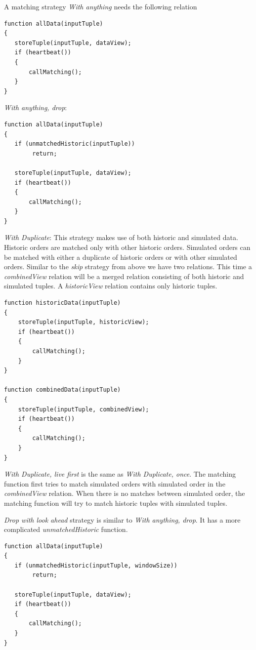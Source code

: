 \documentclass{article}
\begin{document}
\noindent A matching strategy \emph{With anything} needs the following relation
\begin{verbatim}     
function allData(inputTuple)
{
   storeTuple(inputTuple, dataView);
   if (heartbeat())
   {
       callMatching();
   }
}
\end{verbatim}

\noindent \emph{With anything, drop}:
\begin{verbatim}     
function allData(inputTuple)
{
   if (unmatchedHistoric(inputTuple))
        return;
    
   storeTuple(inputTuple, dataView);
   if (heartbeat())
   {
       callMatching();
   }
}
\end{verbatim}

\noindent \emph{With Duplicate}: This strategy makes use of both historic and simulated data. Historic orders are matched only with other historic orders. Simulated orders can be matched with either a duplicate of historic orders or with other simulated orders. Similar to the \emph{skip} strategy from above we have two relations. This time a \emph{combinedView} relation will be a merged relation consisting of both historic and simulated tuples. A \emph{historicView} relation contains only historic tuples.

\begin{verbatim}   
function historicData(inputTuple)
{
    storeTuple(inputTuple, historicView);
    if (heartbeat())
    {
        callMatching();
    }
}

function combinedData(inputTuple)
{
    storeTuple(inputTuple, combinedView);
    if (heartbeat())
    {
        callMatching();
    }
}
\end{verbatim}

\noindent \emph{With Duplicate, live first} is the same as \emph{With Duplicate, once}. The matching function first tries to match simulated orders with simulated order in the \emph{combinedView} relation. When there is no matches between simulated order, the matching function will try to match historic tuples with simulated tuples.

\noindent \emph{Drop with look ahead} strategy is similar to \emph{With anything, drop}. It has a more complicated \emph{unmatchedHistoric} function.
\begin{verbatim}     
function allData(inputTuple)
{
   if (unmatchedHistoric(inputTuple, windowSize))
        return;
    
   storeTuple(inputTuple, dataView);
   if (heartbeat())
   {
       callMatching();
   }
}
\end{verbatim}
\end{document}
